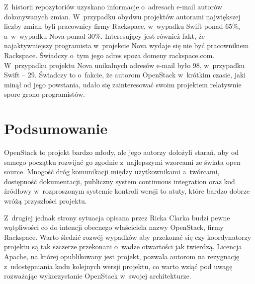 \documentclass[a4paper,12pt]{article}
\begin{document}
	Z~historii repozytoriów uzyskano informacje o~adresach e-mail autorów
	dokonywanych zmian. W~przypadku obydwu projektów autorami największej liczby
	zmian byli pracownicy firmy Rackspace, w~wypadku Swift ponad 65\%,
	a~w~wypadku Nova ponad 30\%. Interesujący jest również fakt, że
	najaktywniejszy programista w~projekcie Nova wydaje się nie być pracownikiem
	Rackspace. Świadczy o~tym jego adres spoza domeny rackspace.com.
	W~przypadku projektu Nova unikalnych adresów e-mail było 98, w~przypadku
	Swift -- 29. Świadczy to o~fakcie, że autorom OpenStack w~krótkim
	czasie, jaki minął od jego powstania, udało się zainteresować swoim
	projektem relatywnie spore grono programistów.

	\section{Podsumowanie}

	OpenStack to projekt bardzo młody, ale jego autorzy dołożyli starań, aby od
	samego początku rozwijać go zgodnie z~najlepszymi wzorcami ze świata open
	source. Mnogość dróg komunikacji między użytkownikami a~twórcami,
	dostępność dokumentacji, publiczny system continuous integration oraz kod
	źródłowy w~rozproszonym systemie kontroli wersji to atuty, które bardzo
	dobrze wróżą przyszłości projektu.

	Z~drugiej jednak strony sytuacja opisana przez Ricka Clarka budzi pewne
	wątpliwości co do intencji obecnego właściciela nazwy OpenStack, firmy
	Rackspace. Warto śledzić rozwój wypadków aby przekonać się czy koordynatorzy
	projektu są tak szczerze przekonani o~wadze otwartości jak twierdzą.
	Licencja Apache, na której opublikowany jest projekt, pozwala autorom na
	rezygnację z~udostępniania kodu kolejnych wersji projektu, co warto wziąć
	pod uwagę rozważając wykorzystanie OpenStack w~swojej architekturze.

	
	
\end{document}
